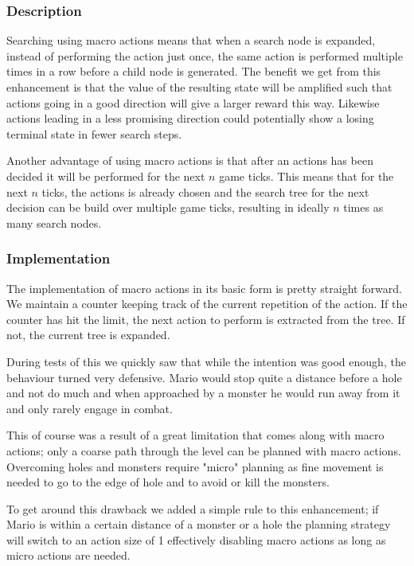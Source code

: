 \documentclass[10pt,a4paper]{article}
\begin{document}
\subsubsection{Description}
Searching using macro actions means that when a search node is expanded, instead of performing the action just once, the same action is performed multiple times in a row before a child node is generated.
The benefit we get from this enhancement is that the value of the resulting state will be amplified such that actions going in a good direction will give a larger reward this way. Likewise actions leading in a less promising direction could potentially show a losing terminal state in fewer search steps.

Another advantage of using macro actions is that after an actions has been decided it will be performed for the next $n$ game ticks. This means that for the next $n$ ticks, the actions is already chosen and the search tree for the next decision can be build over multiple game ticks, resulting in ideally $n$ times as many search nodes.

\subsubsection{Implementation} %
The implementation of macro actions in its basic form is pretty straight forward. We maintain a counter keeping track of the current repetition of the action. If the counter has hit the limit, the next action to perform is extracted from the tree. If not, the current tree is expanded.

During tests of this we quickly saw that while the intention was good enough, the behaviour turned very defensive. Mario would stop quite a distance before a hole and not do much and when approached by a monster he would run away from it and only rarely engage in combat.

This of course was a result of a great limitation that comes along with macro actions; only a coarse path through the level can be planned with macro actions. Overcoming holes and monsters require "micro" planning as fine movement is needed to go to the edge of hole and to avoid or kill the monsters.

To get around this drawback we added a simple rule to this enhancement; if Mario is within a certain distance of a monster or a hole the planning strategy will switch to an action size of 1 effectively disabling macro actions as long as micro actions are needed.
\end{document}
